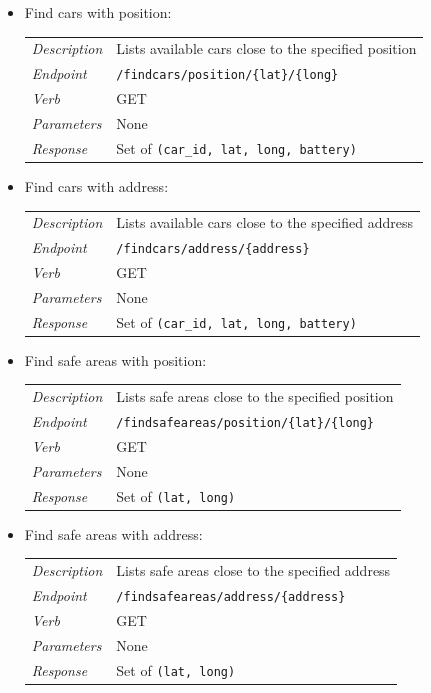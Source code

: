 \documentclass[english]{article}
\newcommand{\code}[1]{\texttt{#1}}
\begin{document}
\begin{itemize}
	\item{Find cars with position:}\\
	\begin{tabular}{ | l l }
		\textit{Description} & Lists available cars close to the specified position\\
		\textit{Endpoint} & \code{/findcars/position/\{lat\}/\{long\}} \\ 
		\textit{Verb} & GET \\  
		\textit{Parameters} & None \\
		\textit{Response} & Set of \code{(car\_id, lat, long, battery)}
	\end{tabular}
	
	\item{Find cars with address:}\\
	\begin{tabular}{ | l l }
		\textit{Description} & Lists available cars close to the specified address\\
		\textit{Endpoint} & \code{/findcars/address/\{address\}} \\ 
		\textit{Verb} & GET \\  
		\textit{Parameters} & None \\
		\textit{Response} & Set of \code{(car\_id, lat, long, battery)}
	\end{tabular}
	
	\item{Find safe areas with position:}\\
	\begin{tabular}{ | l l }
		\textit{Description} & Lists safe areas close to the specified position\\
		\textit{Endpoint} & \code{/findsafeareas/position/\{lat\}/\{long\}} \\ 
		\textit{Verb} & GET \\  
		\textit{Parameters} & None \\
		\textit{Response} & Set of \code{(lat, long)}
	\end{tabular}

	\item{Find safe areas with address:}\\
	\begin{tabular}{ | l l }
		\textit{Description} & Lists safe areas close to the specified address\\
		\textit{Endpoint} & \code{/findsafeareas/address/\{address\}} \\ 
		\textit{Verb} & GET \\  
		\textit{Parameters} & None \\
		\textit{Response} & Set of \code{(lat, long)}
	\end{tabular}
	

\end{itemize}
\end{document}
